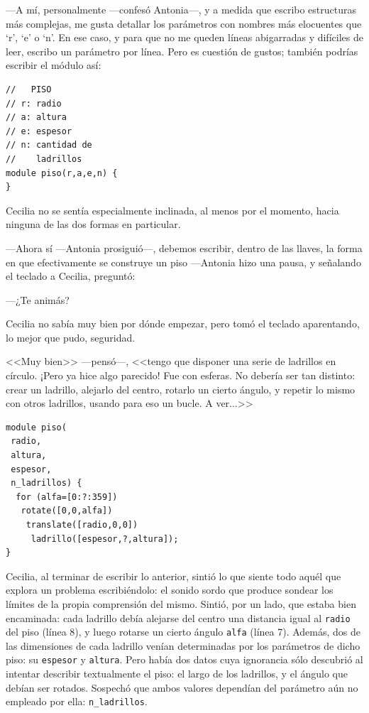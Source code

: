 ---A mí, personalmente ---confesó Antonia---, y a medida que escribo
estructuras más complejas, me gusta detallar los parámetros con
nombres más elocuentes que `r', `e' o `n'. En ese caso, y para que no
me queden líneas abigarradas y difíciles de leer, escribo un parámetro
por línea. Pero es cuestión de gustos; también podrías escribir el
módulo así:

\begin{lstlisting}
//   PISO
// r: radio
// a: altura
// e: espesor
// n: cantidad de 
//    ladrillos
module piso(r,a,e,n) {
}
\end{lstlisting}

Cecilia no se sentía especialmente inclinada, al menos por el momento,
hacia ninguna de las dos formas en particular.

---Ahora sí ---Antonia prosiguió---, debemos escribir, dentro de las
llaves, la forma en que efectivamente se construye un piso
---An\-to\-nia hizo una pausa, y señalando el teclado a Cecilia,
preguntó:

---¿Te animás?

Cecilia no sabía muy bien por dónde empezar, pero tomó el teclado
aparentando, lo mejor que pudo, seguridad.

<<Muy bien>> ---pensó---, <<tengo que disponer una serie de ladrillos
en círculo. ¡Pero ya hice algo parecido! Fue con esferas. No debería
ser tan distinto: crear un ladrillo, alejarlo del centro, rotarlo un
cierto ángulo, y repetir lo mismo con otros ladrillos, usando para eso
un bucle. A ver...>>

    \begin{lstlisting}
module piso(
 radio,
 altura,
 espesor,
 n_ladrillos) {
  for (alfa=[0:?:359])
   rotate([0,0,alfa])
    translate([radio,0,0])
     ladrillo([espesor,?,altura]); 
}
\end{lstlisting}
  
Cecilia, al terminar de escribir lo anterior, sintió lo que siente
todo aquél que explora un problema escribiéndolo: el sonido sordo que
produce sondear los límites de la propia comprensión del
mismo. Sintió, por un lado, que estaba bien encaminada: cada ladrillo
debía alejarse del centro una distancia igual al \texttt{radio} del
piso (línea 8), y luego rotarse un cierto ángulo \texttt{alfa} (línea
7). Además, dos de las dimensiones de cada ladrillo venían
determinadas por los parámetros de dicho piso: su \texttt{espesor} y
\texttt{altura}. Pero había dos datos cuya ignorancia sólo descubrió
al intentar describir textualmente el piso: el largo de los ladrillos,
y el ángulo que debían ser rotados. Sospechó que ambos valores
dependían del parámetro aún no empleado por ella:
\texttt{n\_ladrillos}.

